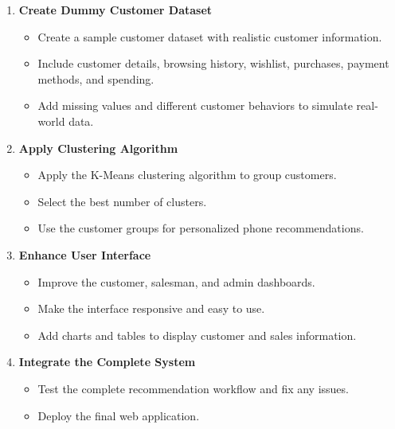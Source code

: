 \documentclass[12pt, a4paper]{report}
\numberwithin{figure}{chapter}
\numberwithin{table}{chapter}
\numberwithin{equation}{chapter}
\begin{document}
\begin{enumerate}
    \item \textbf{Create Dummy Customer Dataset}
    \begin{itemize}
        \item Create a sample customer dataset with realistic customer information.
        \item Include customer details, browsing history, wishlist, purchases, payment methods, and spending.
        \item Add missing values and different customer behaviors to simulate real-world data.
    \end{itemize}

    \item \textbf{Apply Clustering Algorithm}
    \begin{itemize}
        \item Apply the K-Means clustering algorithm to group customers.
        \item Select the best number of clusters.
        \item Use the customer groups for personalized phone recommendations.
    \end{itemize}

    \item \textbf{Enhance User Interface}
    \begin{itemize}
        \item Improve the customer, salesman, and admin dashboards.
        \item Make the interface responsive and easy to use.
        \item Add charts and tables to display customer and sales information.
    \end{itemize}

    \item \textbf{Integrate the Complete System}
    \begin{itemize}
        \item Test the complete recommendation workflow and fix any issues.
        \item Deploy the final web application.
    \end{itemize}

\end{enumerate}%
\renewcommand{\bibname}{References}   %
\end{document}
